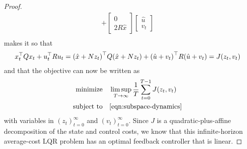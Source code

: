 \documentclass[12pt]{article}
\begin{document}
\begin{proof}
\begin{align*}
        + \begin{bmatrix} 0 \\ 2 R \hat{x} \end{bmatrix}
          \begin{bmatrix} \hat{u} \\ v_t \end{bmatrix} \\
  \end{align*}
  makes it so that
  \begin{align*}
    x_t ^\top Q x_t + u_t ^\top R u_t
      = {\left(\hat{x} + N z_t\right)}^\top Q {\left(\hat{x} + N z_t\right)}
        + {\left(\hat{u} + v_t\right)}^\top R {\left(\hat{u} + v_t\right)}
      = J(z_t, v_t)
  \end{align*}
  and that the objective can now be written as
  \begin{align*}
    \text{minimize}
      &\quad
        \limsup_{T \to \infty} \frac{1}{T} \sum_{t = 0}^{T - 1}
          J(z_t, v_t) \\
    \text{subject to}
      &\quad \eqref{eqn:subspace-dynamics}
  \end{align*}
  with variables in \((z_t)_{t = 0}^{\infty}\) and \((v_t)_{t = 0}^{\infty}\).
  Since \(J\) is a quadratic-plus-affine decomposition of the
  state and control costs,
  we know that this infinite-horizon average-cost LQR problem
  has an optimal feedback controller that is linear.
\end{proof}



\printbibliography
\end{document}
